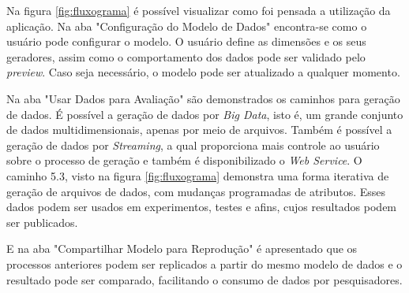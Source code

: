 \documentclass[
	12pt,				%
	openright,			%
	oneside,			%
	a4paper,			%
	english,			%
	brazil				%
	]{abntex2}
\begin{document}
	\par
	Na figura \ref{fig:fluxograma} é possível visualizar como foi pensada a utilização da aplicação.
	Na aba "Configuração do Modelo de Dados" encontra-se como o usuário pode configurar o modelo.
	O usuário define as dimensões e os seus geradores, assim como o comportamento dos dados pode ser validado pelo \emph{preview}. 
	Caso seja necessário, o modelo pode ser atualizado a qualquer momento.
	\par
	Na aba "Usar Dados para Avaliação" são demonstrados os caminhos para geração de dados.
	É possível a geração de dados por \emph{Big Data}, isto é, um grande conjunto de dados multidimensionais, apenas por meio de arquivos.
	Também é possível a geração de dados por \emph{Streaming}, a qual proporciona mais controle ao usuário sobre o processo de geração e também é disponibilizado o \emph{Web Service}.
	O caminho 5.3, visto na figura \ref{fig:fluxograma} demonstra uma forma iterativa de geração de arquivos de dados, com mudanças programadas de atributos.
	Esses dados podem ser usados em experimentos, testes e afins, cujos resultados podem ser publicados.
	\par
	E na aba "Compartilhar Modelo para Reprodução" é apresentado que os processos anteriores podem ser replicados a partir do mesmo modelo de dados e o resultado pode ser comparado, facilitando o consumo de dados por pesquisadores.
	
\end{document}
